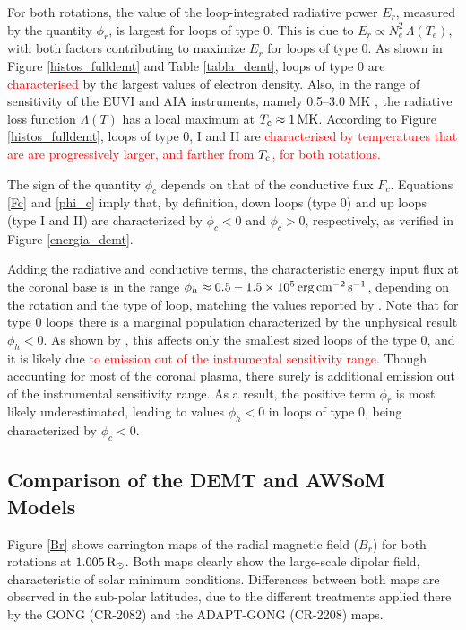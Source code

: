 \documentclass[namedreferences]{solarphysics}
\def\edit#1{\textcolor{Red}{#1}}
\newcommand{\mrsun}{{\rm R_\odot}}
\newcommand{\MK}{{\rm MK}}
\newcommand{\cm}{{\rm cm}}
\newcommand{\cminvs}{\cm^{-2}}
\newcommand{\erg}{{\rm erg}}
\newcommand{\s}{{\rm s}}
\newcommand{\Tc}{T_{\rm c}}
\begin{document}
\begin{article}
{For both rotations, the value of the {loop-integrated} radiative power $E_r$, measured by the quantity $\phi_r$, is largest for loops of type 0. This is due to $E_r\propto N_e^2\,\Lambda(T_e)$, with both factors contributing to maximize $E_r$ for loops of type 0. As shown in Figure \ref{histos_fulldemt} and Table \ref{tabla_demt}, loops of type 0 are \edit{characterised} by {the largest} values of electron density. Also, in the range of sensitivity of the EUVI and AIA instruments, namely 0.5–3.0 MK \citep{nuevo_2015}, the radiative loss function $\Lambda(T)$ has a local maximum at $\Tc\approx 1\,\MK$. According to Figure \ref{histos_fulldemt}, loops of type 0, I and II are \edit{characterised by temperatures that are are progressively larger, and farther from $\Tc$, for both rotations.}}

The sign of the quantity $\phi_c$ depends on that of the conductive flux $F_c$. Equations \ref{Fc} and \ref{phi_c} imply that, by definition, down loops (type 0) and up loops (type I and II) are characterized by $\phi_c<0$ and $\phi_c>0$, respectively, {as verified} in Figure \ref{energia_demt}.

{{Adding the} radiative and conductive terms, the characteristic energy input flux at the coronal base is in the range $\phi_h\approx 0.5-1.5 \times 10^5\,\erg\,\cminvs\,\s^{-1}$, depending on the rotation and the type of {loop, matching the values reported by} \citet{maccormack_2017}. Note that for type 0 loops there is a marginal population characterized by the unphysical result $\phi_h<0$. As shown by \citet{maccormack_2017}, this affects only the smallest sized loops of the type 0, and it is likely due \edit{to emission out of the instrumental sensitivity range}. Though accounting for most of the coronal plasma, there surely is additional emission out of the instrumental sensitivity range. As a result,} the positive term $\phi_r$ is most likely underestimated, leading to values $\phi_h<0$ in loops of type 0, {being characterized by $\phi_c<0$.}

\subsection{{Comparison of the DEMT and AWSoM Models}}\label{awsom_res} 

{Figure \ref{Br} shows carrington maps of {the radial} magnetic {field ($B_r$)} for both rotations at $1.005\, \mrsun$. {Both maps clearly show the large-scale dipolar field, characteristic of solar minimum conditions. Differences between both maps are observed in the sub-polar latitudes, due to the different treatments applied there by the GONG (CR-2082) and the ADAPT-GONG (CR-2208) maps.}}


\end{article}
\end{document}
